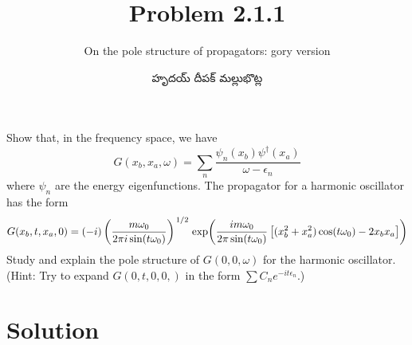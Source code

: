 \documentclass{article}
\title{Problem 2.1.1}
\subtitle{On the pole structure of propagators: gory version}
\author{\begin{telugu}హృదయ్ దీపక్ మల్లుభొట్ల\end{telugu}}
\begin{document}
	\maketitle
	Show that, in the frequency space, we have
	\begin{equation}
		G(x_b, x_a, \omega) = \sum_n \frac{\psi_n(x_b) \psi^\dagger(x_a)}{\omega - \epsilon_n} \label{eq:target1}
	\end{equation}
	where $\psi_n$ are the energy eigenfunctions.
	The propagator for a harmonic oscillator has the form
	\begin{equation}
		G(x_b, t, x_a, 0) = (-i) \left( \frac{m \omega_0}{2 \pi i \sin(t \omega_0)} \right)^{\flatfrac12} \exp(\frac{i m \omega_0}{2 \pi \sin(t\omega_0)}\left[(x_b^2 + x_a^2)\cos(t \omega_0) - 2 x_b x_a \right]) \label{eq:harmonicoscprop}
	\end{equation}
	Study and explain the pole structure of $G(0, 0, \omega)$ for the harmonic oscillator.
	(Hint: Try to expand $G(0, t, 0, 0,)$ in the form $\sum C_n e^{-i t \epsilon_n}$.)

	\section{Solution} \label{sec:solution}
\end{document}
